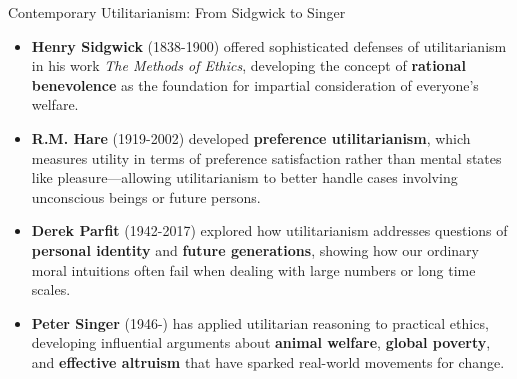 \documentclass[aspectratio=169]{beamer}
\begin{document}
\begin{frame}{Contemporary Utilitarianism: From Sidgwick to Singer}
    \begin{itemize}
        \item \textbf{Henry Sidgwick} (1838-1900) offered sophisticated defenses of utilitarianism in his work \textit{The Methods of Ethics}, developing the concept of \textbf{rational benevolence} as the foundation for impartial consideration of everyone's welfare.
        
        \item \textbf{R.M. Hare} (1919-2002) developed \textbf{preference utilitarianism}, which measures utility in terms of preference satisfaction rather than mental states like pleasure—allowing utilitarianism to better handle cases involving unconscious beings or future persons.
        
        \item \textbf{Derek Parfit} (1942-2017) explored how utilitarianism addresses questions of \textbf{personal identity} and \textbf{future generations}, showing how our ordinary moral intuitions often fail when dealing with large numbers or long time scales.
        
        \item \textbf{Peter Singer} (1946-) has applied utilitarian reasoning to practical ethics, developing influential arguments about \textbf{animal welfare}, \textbf{global poverty}, and \textbf{effective altruism} that have sparked real-world movements for change.
    \end{itemize}
\end{frame}
\end{document}
